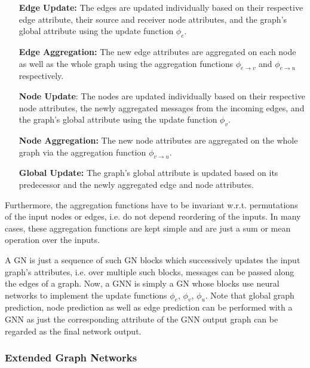 \begin{enumerate}[align=left]
    \item[\textbf{Edge Update:}] The edges are updated individually based on their respective edge attribute, 
    their source and receiver node attributes, and the graph's global attribute using the
    update function $\phi_e$.
    \item[\textbf{Edge Aggregation:}] The new edge attributes are aggregated on each node
    as well as the whole graph using the aggregation functions $\phi_{e \to v}$ and
    $\phi_{e \to u}$ respectively.
    \item[\textbf{Node Update}:] The nodes are updated individually based on their respective
    node attributes, the newly aggregated messages from the incoming edges, and the graph's
    global attribute using the update function $\phi_v$.
    \item[\textbf{Node Aggregation:}] The new node attributes are aggregated on the whole
    graph via the aggregation function $\phi_{v \to u}$.
    \item[\textbf{Global Update:}] The graph's global attribute is updated based on its
    predecessor and the newly aggregated edge and node attributes.
\end{enumerate}



Furthermore, the aggregation functions have to be invariant w.r.t. permutations of the
input nodes or edges, i.e. do not depend reordering of the inputs. In many cases,
these aggregation functions are kept simple and are just a sum or mean operation over
the inputs.

A GN is just a sequence of such GN blocks which successively updates the input graph's
attributes, i.e. over multiple such blocks, messages can be passed along the edges of
a graph. Now, a GNN is simply a GN whose blocks use neural networks to implement the
update functions $\phi_e$, $\phi_v$, $\phi_u$. Note that global graph prediction, 
node prediction as well as edge prediction can be performed with a GNN as just
the corresponding attribute of the GNN output graph can be regarded as the final 
network output.

\subsubsection{Extended Graph Networks}
\label{subsubsec:egns}

